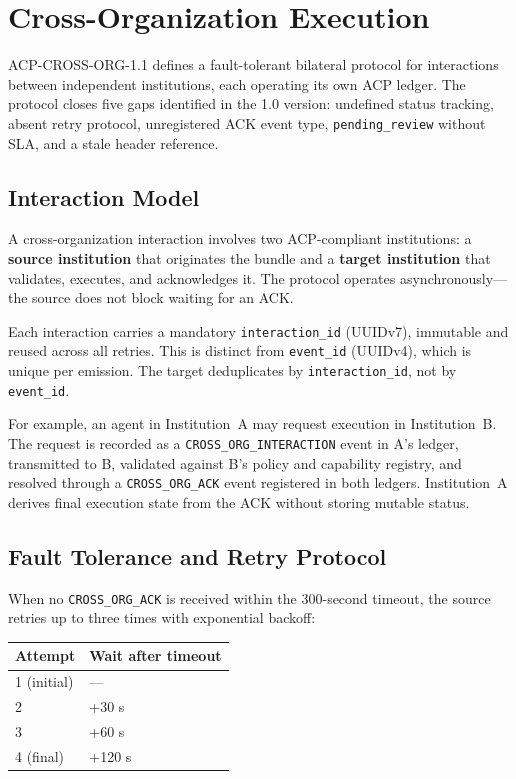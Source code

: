 \documentclass[11pt]{article}
\theoremstyle{definition}
\begin{document}
\section{Cross-Organization Execution}

ACP-CROSS-ORG-1.1 defines a fault-tolerant bilateral protocol for interactions between
independent institutions, each operating its own ACP ledger.
The protocol closes five gaps identified in the 1.0 version: undefined status tracking,
absent retry protocol, unregistered ACK event type, \texttt{pending\_review} without SLA,
and a stale header reference.

\subsection{Interaction Model}

A cross-organization interaction involves two ACP-compliant institutions:
a \textbf{source institution} that originates the bundle and a \textbf{target institution}
that validates, executes, and acknowledges it.
The protocol operates asynchronously---the source does not block waiting for an ACK.

Each interaction carries a mandatory \texttt{interaction\_id} (UUIDv7), immutable and
reused across all retries.
This is distinct from \texttt{event\_id} (UUIDv4), which is unique per emission.
The target deduplicates by \texttt{interaction\_id}, not by \texttt{event\_id}.

For example, an agent in Institution~A may request execution in Institution~B.
The request is recorded as a \texttt{CROSS\_ORG\_INTERACTION} event in A's ledger,
transmitted to B, validated against B's policy and capability registry,
and resolved through a \texttt{CROSS\_ORG\_ACK} event registered in both ledgers.
Institution~A derives final execution state from the ACK without storing mutable status.

\subsection{Fault Tolerance and Retry Protocol}

When no \texttt{CROSS\_ORG\_ACK} is received within the 300-second timeout,
the source retries up to three times with exponential backoff:

\begin{center}
\begin{tabular}{@{}ll@{}}
\toprule
\textbf{Attempt} & \textbf{Wait after timeout} \\
\midrule
1 (initial) & --- \\
2 & +30 s \\
3 & +60 s \\
4 (final) & +120 s \\
\bottomrule
\end{tabular}
\end{center}
\end{document}
